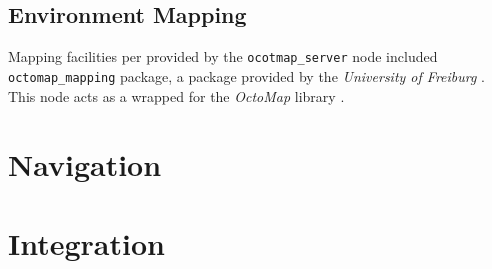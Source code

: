 \subsection{Environment Mapping}

Mapping facilities per provided by the \texttt{ocotmap\_server} node included \texttt{octomap\_mapping} package, a package provided by the \emph{University of Freiburg} \cite{ros_wiki_octomap}. This node acts as a wrapped for the \emph{OctoMap} library \cite{octomap}. 


\section{Navigation}


\section{Integration}